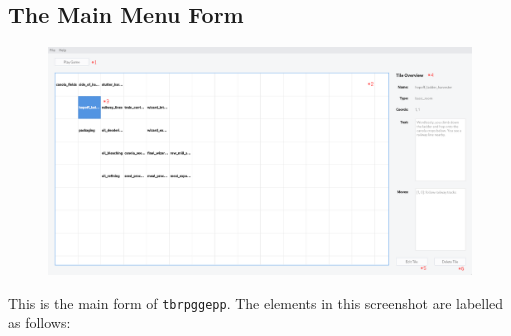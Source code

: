 \documentclass{article} \usepackage[margin=1in,headheight=57pt,headsep=0.1in]{geometry}
\begin{document}
\subsection{The Main Menu Form}
\begin{figure}[H]
	\centering
	\includegraphics[width=1.0\textwidth]{./mainMenuForm.png}
\end{figure}
This is the main form of \texttt{tbrpggepp}. The elements in this screenshot are labelled as follows:
\end{document}
